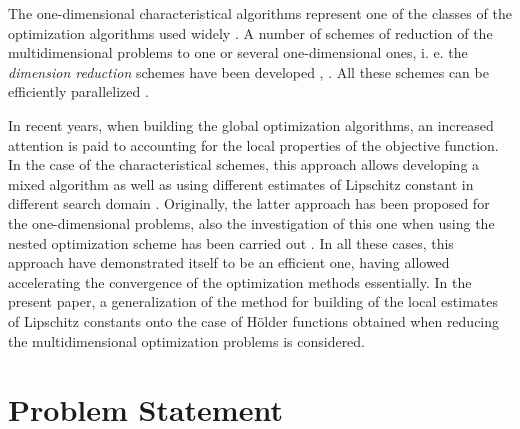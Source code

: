 \documentclass[procedia]{easychair}
\begin{document}
The one-dimensional characteristical algorithms represent one of the classes of the
optimization algorithms used widely \cite{optHandbook}. A number of schemes of reduction of the
multidimensional problems to one or several one-dimensional ones, i. e. the \textit{dimension
reduction} schemes have been developed \cite{evolvents2013}, \cite{gergelGrishaginStringin2013}.
All these schemes can be efficiently parallelized \cite{optParallelBook}.
\par
In recent years, when building the global optimization algorithms, an increased attention
is paid to accounting for the local properties of the objective function. In the
case of the characteristical schemes, this approach allows developing a mixed algorithm
\cite{mixedAlg} as well as using different estimates of Lipschitz constant in different search
domain \cite{sergLocalTuningFirst}. Originally, the latter approach has been proposed for the one-dimensional
problems, also the investigation of this one when using the nested optimization scheme
has been carried out \cite{nestedLocal}. In all these cases, this approach have demonstrated itself to
be an efficient one, having allowed accelerating the convergence of the
optimization methods essentially. In the present paper, a generalization of the method
for building of the local estimates of Lipschitz constants onto the case of Hölder
functions obtained when reducing the multidimensional optimization problems is considered.

\section{Problem Statement}
\label{sect:problem}
\end{document}
